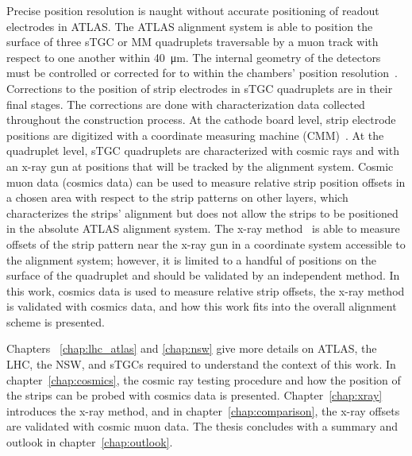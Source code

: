 Precise position resolution is naught without accurate positioning of readout electrodes in ATLAS. The ATLAS alignment system is able to position the surface of three sTGC or MM quadruplets traversable by a muon track with respect to one another within \SI{40}{\micro\meter}. The internal geometry of the detectors must be controlled or corrected for to within the chambers' position resolution~\cite{nsw_tdr}. Corrections to the position of strip electrodes in sTGC quadruplets are in their final stages. The corrections are done with characterization data collected throughout the construction process. At the cathode board level, strip electrode positions are digitized with a coordinate measuring machine (CMM)~\cite{carlson_results_2019}. At the quadruplet level, sTGC quadruplets are characterized with cosmic rays and with an x-ray gun at positions that will be tracked by the alignment system. Cosmic muon data (cosmics data) can be used to measure relative strip position offsets in a chosen area with respect to the strip patterns on other layers, which characterizes the strips' alignment but does not allow the strips to be positioned in the absolute ATLAS alignment system. The x-ray method~\cite{lefebvre_precision_2020} is able to measure offsets of the strip pattern near the x-ray gun in a coordinate system accessible to the alignment system; however, it is limited to a handful of positions on the surface of the quadruplet and should be validated by an independent method. In this work, cosmics data is used to measure relative strip offsets, the x-ray method is validated with cosmics data, and how this work fits into the overall alignment scheme is presented.

Chapters ~\ref{chap:lhc_atlas} and \ref{chap:nsw} give more details on ATLAS, the LHC, the NSW, and sTGCs required to understand the context of this work. In chapter~\ref{chap:cosmics}, the cosmic ray testing procedure and how the position of the strips can be probed with cosmics data is presented. Chapter~\ref{chap:xray} introduces the x-ray method, and in chapter~\ref{chap:comparison}, the x-ray offsets are validated with cosmic muon data. The thesis concludes with a summary and outlook in chapter~\ref{chap:outlook}.

